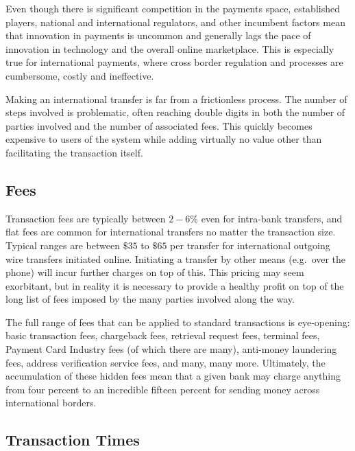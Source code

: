 \documentclass[a4paper]{article}
\begin{document}
Even though there is significant competition in the payments space,
established players, national and international regulators, and other
incumbent factors mean that innovation in payments is uncommon and
generally lags the pace of innovation in technology and the overall
online marketplace. This is especially true for international
payments, where cross border regulation and processes are cumbersome,
costly and ineffective.

Making an international transfer is far from a frictionless
process. The number of steps involved is problematic, often reaching
double digits in both the number of parties involved and the number of
associated fees. This quickly becomes expensive to users of the system
while adding virtually no value other than facilitating the
transaction itself.

\subsection{Fees}


Transaction fees are typically between $2-6\%$ even for intra-bank
transfers, and flat fees are common for international transfers no
matter the transaction size. Typical ranges are between $\$35$ to
$\$65$ per transfer for international outgoing wire transfers
initiated online. Initiating a transfer by other means (e.g.\ over the
phone) will incur further charges on top of this. This pricing may
seem exorbitant, but in reality it is necessary to provide a healthy
profit on top of the long list of fees imposed by the many parties
involved along the way.

The full range of fees that can be applied to standard transactions is
eye-opening: basic transaction fees, chargeback fees, retrieval
request fees, terminal fees, Payment Card Industry fees (of which
there are many), anti-money laundering fees, address verification
service fees, and many, many more. Ultimately, the accumulation of
these hidden fees mean that a given bank may charge anything from four
percent to an incredible fifteen percent for sending money across
international borders.

\subsection{Transaction Times}
\end{document}
